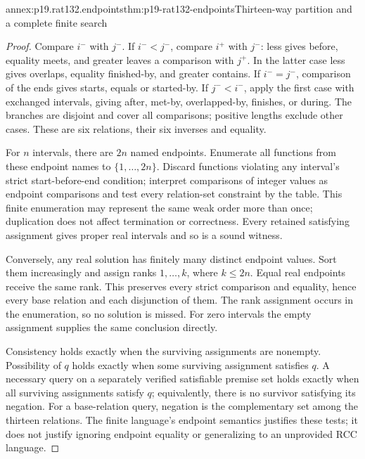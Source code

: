 \begin{annexitem}{annex:p19.rat132.endpoints}{thm:p19-rat132-endpoints}{Thirteen-way partition and a complete finite search}
\begin{proof}
Compare \(i^-\) with \(j^-\). If \(i^-<j^-\), compare
\(i^+\) with \(j^-\): less gives before, equality meets, and greater
leaves a comparison with \(j^+\). In the latter case less gives overlaps,
equality finished-by, and greater contains. If \(i^-=j^-\), comparison
of the ends gives starts, equals or started-by. If \(j^-<i^-\),
apply the first case with exchanged intervals, giving after, met-by,
overlapped-by, finishes, or during. The branches are disjoint and cover
all comparisons; positive lengths exclude other cases. These are six
relations, their six inverses and equality.

For \(n\) intervals, there are \(2n\) named endpoints. Enumerate all
functions from these endpoint names to \(\{1,\ldots,2n\}\). Discard
functions violating any interval's strict start-before-end condition;
interpret comparisons of integer values as endpoint comparisons and test
every relation-set constraint by the table. This finite enumeration may
represent the same weak order more than once; duplication does not affect
termination or correctness. Every retained satisfying assignment gives
proper real intervals and so is a sound witness.

Conversely, any real solution has finitely many distinct endpoint values.
Sort them increasingly and assign ranks \(1,\ldots,k\), where
\(k\leq2n\). Equal real endpoints receive the same rank. This preserves
every strict comparison and equality, hence every base relation and each
disjunction of them. The rank assignment occurs in the enumeration, so
no solution is missed. For zero intervals the empty assignment supplies
the same conclusion directly.

Consistency holds exactly when the surviving assignments are nonempty.
Possibility of \(q\) holds exactly when some surviving assignment satisfies
\(q\). A necessary query on a separately verified satisfiable premise set
holds exactly when all surviving assignments satisfy \(q\); equivalently,
there is no survivor satisfying its negation. For a base-relation query,
negation is the complementary set among the thirteen relations. The
finite language's endpoint semantics justifies these tests; it does not
justify ignoring endpoint equality or generalizing to an unprovided RCC
language.
\end{proof}
\end{annexitem}

